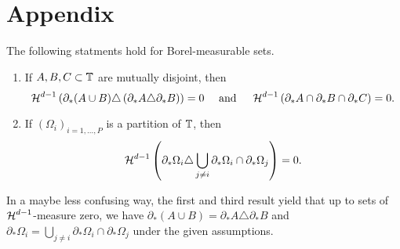\chapter{Appendix}

\begin{lemma}
	\label{identities_for_measure_theoretic_boundaries}
	The following statments hold for Borel-measurable sets.
	\begin{enumerate}
		\item 
		\label{item_disjoint_sets}
		If $ A, B, C \subset \operatorname{\mathbb{T}} $ are mutually disjoint, then
		\begin{equation*}	
			\operatorname{\mathcal{H}}^{ d - 1 } \left(
				\partial_{ \ast } ( A \cup B ) 
				\triangle  
				\left( \partial_{ \ast } A \triangle \partial_{ \ast } B \right)
			\right)
			=
			0
			\quad 
			\text{ and }
			\quad
			\operatorname{\mathcal{H}}^{ d - 1 } \left(
				\partial_{ \ast } A
				\cap
				\partial_{ \ast } B
				\cap
				\partial_{ \ast } C
			\right)
			=
			0.
		\end{equation*}
		
		\item 
		\label{rewriting_boundary_via_interfaces}
		If $ ( \Omega_{ i } )_{ i = 1 , \dotsc , P } $ is a partition of $ \operatorname{\mathbb{T}} $, then
		\begin{equation*}
			\operatorname{\mathcal{H}}^{ d - 1 } \left(
				\partial_{ \ast } \Omega_{ i }
				\triangle
				\bigcup_{ j \neq i }
				\partial_{ \ast } \Omega_{ i }
				\cap
				\partial_{ \ast } \Omega_{ j }
			\right) = 0.
		\end{equation*}
	\end{enumerate}
\end{lemma}

\begin{remark}
	In a maybe less confusing way, the first and third result yield that up to 
	sets 
	of $ \operatorname{\mathcal{H}}^{ d - 1 } $-measure zero, we have
	$  \partial_{ \ast } ( A \cup B ) 
	=  
	 \partial_{ \ast } A \triangle \partial_{ \ast } B
	$
	and
	$
	\partial_{ \ast } \Omega_{ i }
	=
	\bigcup_{ j \neq i }
	\partial_{ \ast } \Omega_{ i }
	\cap
	\partial_{ \ast } \Omega_{ j }
	$
	under the given assumptions.
\end{remark}

